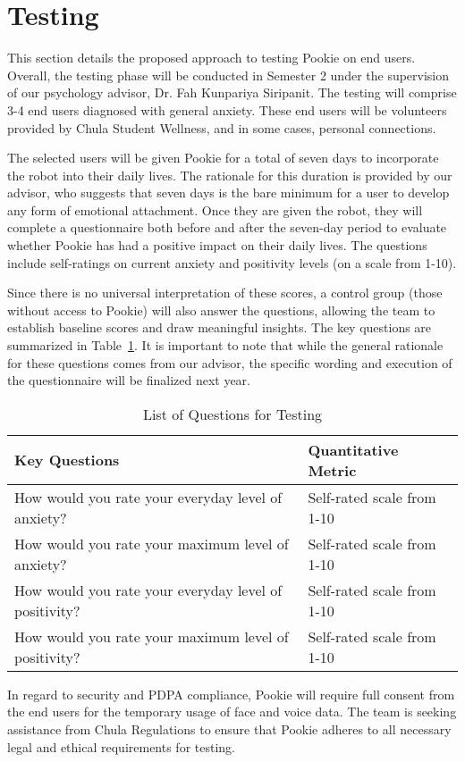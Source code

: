 \section{Testing}

This section details the proposed approach to testing Pookie on end users. Overall, the testing phase will be conducted in Semester 2 under the supervision of our psychology advisor, Dr. Fah Kunpariya Siripanit. The testing will comprise 3-4 end users diagnosed with general anxiety. These end users will be volunteers provided by Chula Student Wellness, and in some cases, personal connections. 

The selected users will be given Pookie for a total of seven days to incorporate the robot into their daily lives. The rationale for this duration is provided by our advisor, who suggests that seven days is the bare minimum for a user to develop any form of emotional attachment. Once they are given the robot, they will complete a questionnaire both before and after the seven-day period to evaluate whether Pookie has had a positive impact on their daily lives. The questions include self-ratings on current anxiety and positivity levels (on a scale from 1-10). 

Since there is no universal interpretation of these scores, a control group (those without access to Pookie) will also answer the questions, allowing the team to establish baseline scores and draw meaningful insights. The key questions are summarized in Table~\ref{table:questions}. It is important to note that while the general rationale for these questions comes from our advisor, the specific wording and execution of the questionnaire will be finalized next year.

\begin{table}[h]
\centering
\caption{List of Questions for Testing}
\label{table:questions}
\begin{tabular}{|l|l|}
\hline
\textbf{Key Questions} & \textbf{Quantitative Metric} \\ \hline
How would you rate your everyday level of anxiety? & Self-rated scale from 1-10 \\ \hline
How would you rate your maximum level of anxiety? & Self-rated scale from 1-10 \\ \hline
How would you rate your everyday level of positivity? & Self-rated scale from 1-10 \\ \hline
How would you rate your maximum level of positivity? & Self-rated scale from 1-10 \\ \hline
\end{tabular}
\end{table}

In regard to security and PDPA compliance, Pookie will require full consent from the end users for the temporary usage of face and voice data. The team is seeking assistance from Chula Regulations to ensure that Pookie adheres to all necessary legal and ethical requirements for testing.
